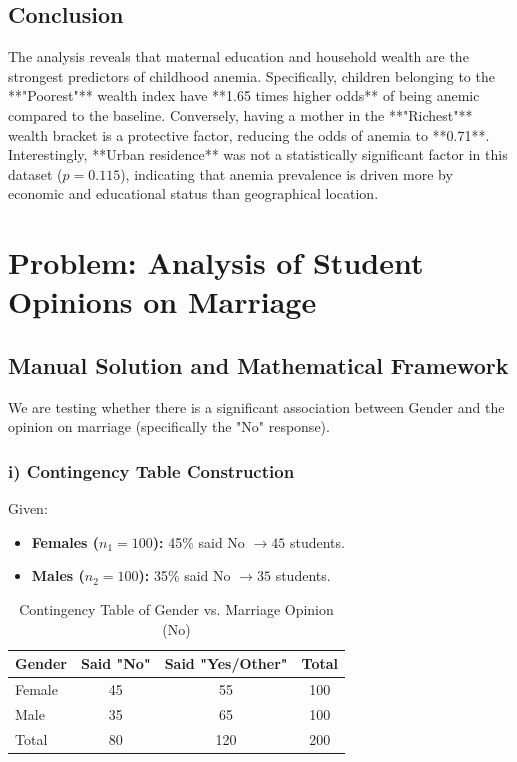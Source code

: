 \documentclass[12pt, a4paper]{article}
\begin{document}
\subsection{Conclusion}
The analysis reveals that maternal education and household wealth are the strongest predictors of childhood anemia. Specifically, children belonging to the **"Poorest"** wealth index have **1.65 times higher odds** of being anemic compared to the baseline. Conversely, having a mother in the **"Richest"** wealth bracket is a protective factor, reducing the odds of anemia to **0.71**. Interestingly, **Urban residence** was not a statistically significant factor in this dataset ($p = 0.115$), indicating that anemia prevalence is driven more by economic and educational status than geographical location.

\newpage
\section{Problem: Analysis of Student Opinions on Marriage}
\label{prob_marriage}

\subsection{Manual Solution and Mathematical Framework}
We are testing whether there is a significant association between Gender and the opinion on marriage (specifically the "No" response).

\subsubsection{i) Contingency Table Construction}
Given:
\begin{itemize}
    \item \textbf{Females ($n_1 = 100$):} 45\% said No $\rightarrow 45$ students.
    \item \textbf{Males ($n_2 = 100$):} 35\% said No $\rightarrow 35$ students.
\end{itemize}

\begin{table}[h!]
\centering
\caption{Contingency Table of Gender vs. Marriage Opinion (No)}
\begin{tabular}{@{}lccc@{}}
\toprule
Gender & Said "No" & Said "Yes/Other" & Total \\ \midrule
Female & 45 & 55 & 100 \\
Male & 35 & 65 & 100 \\ \midrule
Total & 80 & 120 & 200 \\ \bottomrule
\end{tabular}
\end{table}
\end{document}
